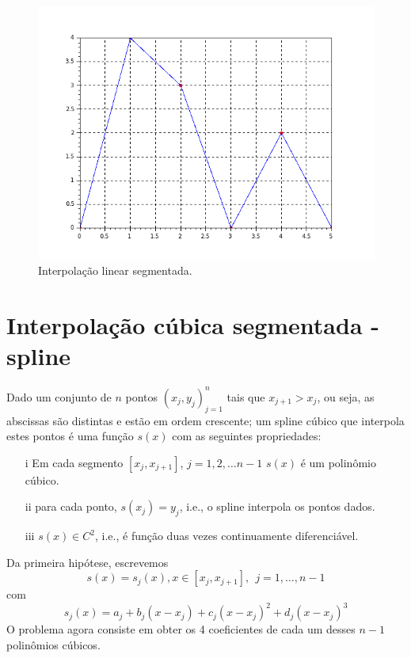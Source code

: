 \documentclass[main.tex]{subfiles}
\begin{document}
\begin{figure}[htp]
\begin{center}
\includegraphics[scale=0.5]{./cap_aproxfun/pics/interpolacao_linear_segmentada.png}
\caption{Interpolação linear segmentada.}
\label{fig:linear_segmentada}
\end{center}
\end{figure}


\section{Interpolação cúbica segmentada - spline}
Dado um conjunto de $n$ pontos $\left(x_j,y_j\right)_{j=1}^n$ tais que $x_{j+1}>x_j$, ou seja, as abscissas são distintas e estão em ordem crescente; um spline cúbico que interpola estes pontos é uma função $s(x)$ com as seguintes propriedades:
\begin{itemize}
\item[i] Em cada segmento $[x_j,x_{j+1}]$, $j=1,2,\ldots n-1$ $s(x)$ é um polinômio cúbico.
\item[ii] para cada ponto, $s(x_j)=y_j$, i.e., o spline interpola os pontos dados.
\item[iii] $s(x)\in C^2$, i.e., é função duas vezes continuamente diferenciável.
\end{itemize}

Da primeira hipótese, escrevemos
$$s(x)=s_j(x),x \in [x_j,x_{j+1}],~~ j=1,\ldots, n-1$$
com
$$s_j(x)=a_j+b_j(x-x_j)+c_j(x-x_j)^2+d_j(x-x_j)^3$$
O problema agora consiste em obter os 4 coeficientes de cada um desses $n-1$ polinômios cúbicos.
\end{document}

